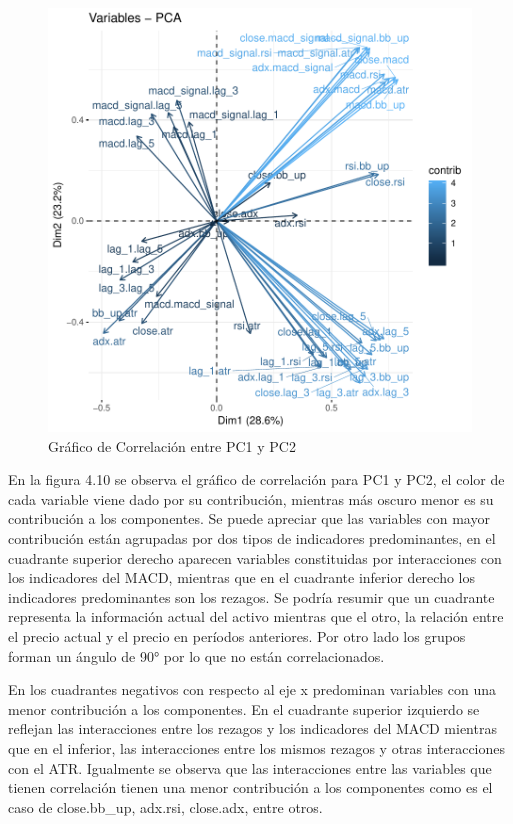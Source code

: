 \documentclass[a4paper,12pt]{Latex/Classes/PhDthesisPSnPDF}
\begin{document}
\begin{figure}[H]
\centering
\includegraphics{main-016}
\caption{Gráfico de Correlación entre PC1 y PC2}
\end{figure}

En la figura 4.10 se observa el gráfico de correlación para PC1 y PC2, el color de cada variable viene dado por su contribución, mientras más oscuro menor es su contribución a los componentes. Se puede apreciar que las variables con mayor contribución están agrupadas por dos tipos de indicadores predominantes, en el cuadrante superior derecho aparecen variables constituidas por interacciones con los indicadores del MACD, mientras que en el cuadrante inferior derecho los indicadores predominantes son los rezagos. Se podría resumir que un cuadrante representa la información actual del activo mientras que el otro, la relación entre el precio actual y el precio en períodos anteriores. Por otro lado los grupos forman un ángulo de 90° por lo que no están correlacionados.

En los cuadrantes negativos con respecto al eje x predominan variables con una menor contribución a los componentes. En el cuadrante superior izquierdo se reflejan las interacciones entre los rezagos y los indicadores del MACD mientras que en el inferior, las interacciones entre los mismos rezagos y otras interacciones con el ATR. Igualmente se observa que las interacciones entre las variables que tienen correlación tienen una menor contribución a los componentes como es el caso de close.bb\_up, adx.rsi, close.adx, entre otros.
\end{document}
